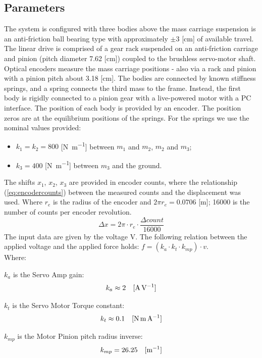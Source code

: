 \subsection{Parameters}
The system is configured with three bodies above the mass carriage suspension 
is an anti-friction ball bearing type with approximately $\pm 3$ 
[\si{\centi\meter}] of available travel. 
The linear drive is comprised of a gear rack suspended on an anti-friction 
carriage and pinion (pitch diameter 7.62 [\si{\centi\meter}]) coupled to the 
brushless servo-motor shaft.
Optical encoders measure the mass carriage positions - also via a rack and 
pinion with a pinion pitch about 3.18 [\si{\centi\meter}].
The bodies are connected by known stiffness springs, and a spring connects the 
third mass to the frame. Instead, the first body is rigidly connected to a 
pinion gear with a live-powered motor with a PC interface.
The position of each body is provided by an encoder. The position zeros are at 
the equilibrium positions of the springs.
For the springs we use the nominal values provided:
%
\begin{itemize}
	\item $k_1 = k_2 = 800$ [\si{\newton\per\meter}] between $m_1$ and $m_2$, $m_2$ 
and $m_3$;
	\item $k_3 = 400$ [\si{\newton\per\meter}] between $m_3$ and the ground.
\end{itemize}
%
The shifts $x_1$, $x_2$, $x_3$ are provided in encoder counts, where the 
relationship (\ref{eq:encodercounts}) between the measured counts and the 
displacement was used.
Where $r_{e}$ is the radius of the encoder and $2\pi r_{e} = 0.0706$ 
[\si{\meter}]; 16000 is the number of counts per encoder revolution.
%
\begin{equation}
	\Delta x = 2\pi \cdot r_{e} \cdot \frac{\Delta count}{16000}
	\label{eq:encodercounts}
\end{equation}
%
The input data are given by the voltage \si{\volt}. 
The following relation between the applied voltage and the applied force holds:
$f = (k_a \cdot k_t \cdot k_{mp}) \cdot v$.\\
Where:\begin{description}
	\item $k_a$ is the Servo Amp gain:
	\begin{equation*}
		k_a \approx 2 \quad [\text{\si{\ampere\per\volt}}]
	\end{equation*}
	\item $k_t$ is the Servo Motor Torque constant:
	\begin{equation*}
		k_t	\approx	0.1 \quad 	[\text{\si{\newton\meter\per\ampere}}]
	\end{equation*}
	\item $k_{mp}$ is the Motor Pinion pitch radius inverse:
	\begin{equation*}
		k_{mp} 	= 26.25 \quad	[\text{\si{\per\meter}}]
	\end{equation*}
\end{description}

